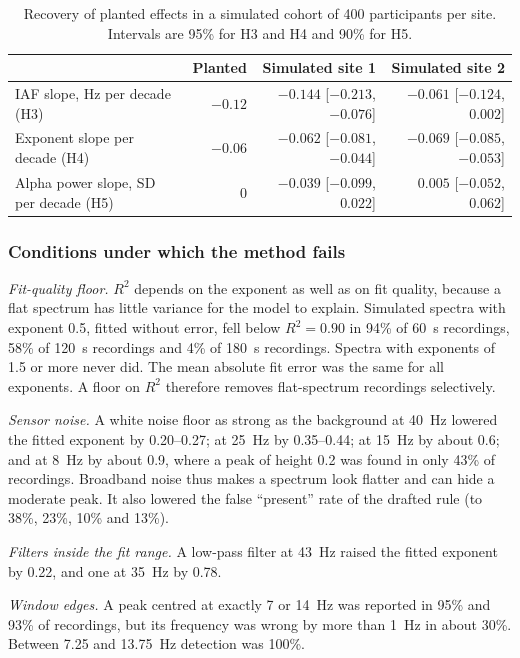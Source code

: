 \documentclass[11pt,a4paper]{article}
\begin{document}
\begin{table}[ht]
\centering
\caption{Recovery of planted effects in a simulated cohort of 400 participants per site.
Intervals are 95\% for H3 and H4 and 90\% for H5.}
\label{tab:simcohort}
\begin{tabular}{lrrr}
\toprule
 & Planted & Simulated site 1 & Simulated site 2 \\
\midrule
IAF slope, Hz per decade (H3) & $-0.12$ & $-0.144$ [$-0.213$, $-0.076$] & $-0.061$ [$-0.124$, $0.002$] \\
Exponent slope per decade (H4) & $-0.06$ & $-0.062$ [$-0.081$, $-0.044$] & $-0.069$ [$-0.085$, $-0.053$] \\
Alpha power slope, SD per decade (H5) & $0$ & $-0.039$ [$-0.099$, $0.022$] & $0.005$ [$-0.052$, $0.062$] \\
\bottomrule
\end{tabular}
\end{table}

\subsubsection{Conditions under which the method fails}

\emph{Fit-quality floor.} $R^2$ depends on the exponent as well as on fit quality, because
a flat spectrum has little variance for the model to explain. Simulated spectra with
exponent 0.5, fitted without error, fell below $R^2 = 0.90$ in 94\% of 60~s recordings,
58\% of 120~s recordings and 4\% of 180~s recordings. Spectra with exponents of 1.5 or more
never did. The mean absolute fit error was the same for all exponents. A floor on $R^2$
therefore removes flat-spectrum recordings selectively.

\emph{Sensor noise.} A white noise floor as strong as the background at 40~Hz lowered the
fitted exponent by 0.20--0.27; at 25~Hz by 0.35--0.44; at 15~Hz by about 0.6; and at 8~Hz
by about 0.9, where a peak of height 0.2 was found in only 43\% of recordings. Broadband
noise thus makes a spectrum look flatter and can hide a moderate peak. It also lowered the
false ``present'' rate of the drafted rule (to 38\%, 23\%, 10\% and 13\%).

\emph{Filters inside the fit range.} A low-pass filter at 43~Hz raised the fitted exponent
by 0.22, and one at 35~Hz by 0.78.

\emph{Window edges.} A peak centred at exactly 7 or 14~Hz was reported in 95\% and 93\% of
recordings, but its frequency was wrong by more than 1~Hz in about 30\%. Between 7.25 and
13.75~Hz detection was 100\%.
\end{document}
